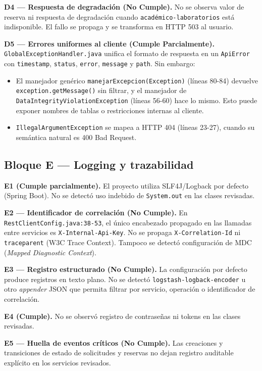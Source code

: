 \documentclass[11pt,a4paper]{article}
\begin{document}
\textbf{D4 --- Respuesta de degradación (No Cumple).} No se observa valor de
reserva ni respuesta de degradación cuando \texttt{académico-laboratorios}
está indisponible. El fallo se propaga y se transforma en HTTP 503 al
usuario.

\textbf{D5 --- Errores uniformes al cliente (Cumple Parcialmente).}
\texttt{GlobalExceptionHandler.java} unifica el formato de respuesta en un
\texttt{ApiError} con \texttt{timestamp}, \texttt{status}, \texttt{error},
\texttt{message} y \texttt{path}. Sin embargo:

\begin{itemize}
  \item El manejador genérico \texttt{manejarExcepcion(Exception)} (líneas
        80-84) devuelve \texttt{exception.getMessage()} sin filtrar, y el
        manejador de \texttt{DataIntegrityViolationException} (líneas 56-60)
        hace lo mismo. Esto puede exponer nombres de tablas o restricciones
        internas al cliente.
  \item \texttt{IllegalArgumentException} se mapea a HTTP 404 (líneas 23-27),
        cuando su semántica natural es 400 Bad Request.
\end{itemize}

\subsection{Bloque E --- Logging y trazabilidad}

\textbf{E1 (Cumple parcialmente).} El proyecto utiliza SLF4J/Logback por
defecto (Spring Boot). No se detectó uso indebido de \texttt{System.out} en
las clases revisadas.

\textbf{E2 --- Identificador de correlación (No Cumple).} En
\texttt{RestClientConfig.java:38-53}, el único encabezado propagado en las
llamadas entre servicios es \texttt{X-Internal-Api-Key}. No se propaga
\texttt{X-Correlation-Id} ni \texttt{traceparent} (W3C Trace Context).
Tampoco se detectó configuración de MDC (\emph{Mapped Diagnostic Context}).

\textbf{E3 --- Registro estructurado (No Cumple).} La configuración por defecto
produce registros en texto plano. No se detectó \texttt{logstash-logback-encoder}
u otro \emph{appender} JSON que permita filtrar por servicio, operación o
identificador de correlación.

\textbf{E4 (Cumple).} No se observó registro de contraseñas ni tokens en las
clases revisadas.

\textbf{E5 --- Huella de eventos críticos (No Cumple).} Las creaciones y
transiciones de estado de solicitudes y reservas no dejan registro auditable
explícito en los servicios revisados.
\end{document}
